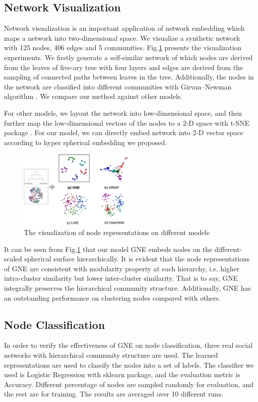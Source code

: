 \documentclass{article}
\theoremstyle{definition}
\begin{document}
	\subsection{Network Visualization}
	Network visualization is an important application of network embedding which maps a network into two-dimensional space. We visualize a synthetic network with 125 nodes, 406 edges and 5 communities. Fig.\ref{fig:visualization} presents the visualization experiments. We firstly generate a self-similar network of which nodes are derived from the leaves of five-ary tree with four layers and edges are derived from the sampling of connected paths between leaves in the tree. Additionally, the nodes in the network are classified into different communities with Girvan–Newman algorithm \cite{girvan2002community}. We compare our method against other models.

	For other models, we layout the network into low-dimensional space, and then further map the low-dimensional vectors of the nodes to a 2-D space with t-SNE package \cite{Maaten2008Visualizing}. For our model, we can directly embed network into 2-D vector space according to hyper spherical embedding we proposed.
	\begin{figure}[H]
		\center
		\includegraphics[width=0.5\textwidth]{figure/visualization.pdf}
		\caption{The visualization of node representations on different models}
		\label{fig:visualization}
	\end{figure}
	It can be seen from Fig.\ref{fig:visualization} that our model GNE embeds nodes on the different-scaled spherical surface hierarchically. It is evident that the node representations of GNE are consistent with modularity property at each hierarchy, i.e. higher intra-cluster similarity but lower inter-cluster similarity. That is to say, GNE integrally preserves the hierarchical community structure. Additionally, GNE has an outstanding performance on clustering nodes compared with others.
	
	

	\subsection{Node Classification}
	In order to verify the effectiveness of GNE on node classification, three real social networks with hierarchical community structure are used. The learned representations are used to classify the nodes into a set of labels. The classifier we used is Logistic Regression with sklearn package, and the evaluation metric is Accuracy. Different percentage of nodes are sampled randomly for evaluation, and the rest are for training. The results are averaged over 10 different runs. 
\end{document}
